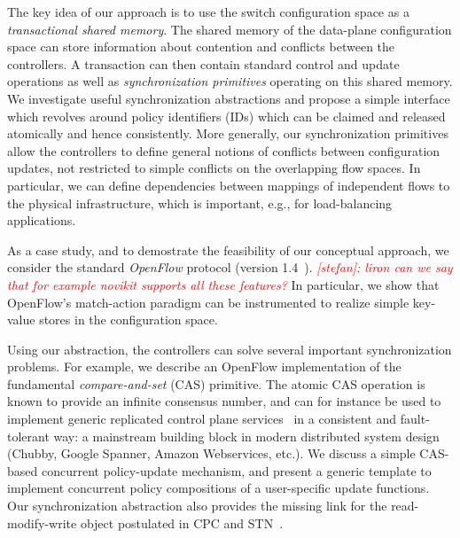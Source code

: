 \documentclass[conference]{sigcomm-alternate}
\newcommand{\stefan}[1]{\textit{\textcolor{red}{[stefan]: #1}}} %
\newcommand{\petr}[1]{\textit{\textcolor{blue}{[petr]: #1}}} %
\begin{document}
The key idea of our approach is to use the switch configuration space
as a \emph{transactional shared memory}. 
The shared memory of the data-plane configuration space 
can store information about  contention and conflicts
between the controllers.
A transaction can then contain standard control and update operations
as well as  \emph{synchronization primitives} operating on this shared
memory.
We investigate useful synchronization abstractions and propose 
a simple interface which revolves around policy identifiers (IDs)
which can be claimed and released atomically and hence consistently. 
More generally, our synchronization primitives allow the controllers to define
general notions of conflicts between configuration updates,
not restricted to simple conflicts on the overlapping flow spaces.
In particular, we can define dependencies between mappings of
independent flows to the physical infrastructure, which is important,
e.g., for load-balancing applications.

As a case study, and to demostrate the feasibility
of our conceptual approach, we 
consider the standard \emph{OpenFlow}
 protocol (version 1.4~\cite{openflow}). \stefan{liron can we say that
 for example novikit supports all these features?}
 In particular, we show that OpenFlow's match-action paradigm can be instrumented
to realize simple key-value stores in the configuration space.

Using our abstraction, the controllers can
solve several important synchronization problems.
For example, we describe an OpenFlow implementation of the fundamental
\emph{compare-and-set} (CAS) primitive.
The atomic CAS operation is known to provide an infinite consensus number,
and can for instance be used to 
implement generic replicated control plane services~\cite{Her91} in a consistent and
fault-tolerant way: a mainstream building block in
modern distributed system design (Chubby, Google Spanner, Amazon Webservices, etc.).
We discuss a simple CAS-based concurrent policy-update mechanism,
and present a generic template to implement concurrent policy
compositions of a user-specific update functions.
Our synchronization abstraction also provides
the missing link for the read-modify-write object
postulated in CPC and STN~\cite{stn,infocom15}. %


\end{document}
